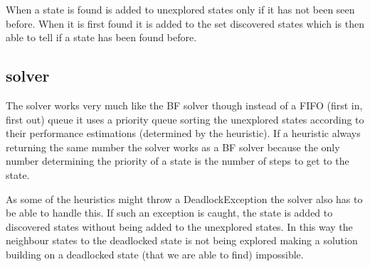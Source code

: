 When a state is found is added to unexplored states only if it has not
been seen before. When it is first found it is added to the set
discovered states which is then able to tell if a state has been found
before.

\subsection{\astar solver}
The \astar solver works very much like the BF solver though instead of
a FIFO (first in, first out) queue it uses a priority queue sorting
the unexplored states according to their performance estimations
(determined by the heuristic). If a heuristic always returning the
same number the solver works as a BF solver because the only number
determining the priority of a state is the number of steps to get to
the state.

As some of the heuristics might throw a DeadlockException the \astar
solver also has to be able to handle this. If such an exception is
caught, the state is added to discovered states without being added to
the unexplored states. In this way the neighbour states to the
deadlocked state is not being explored making a solution building on a
deadlocked state (that we are able to find) impossible.

